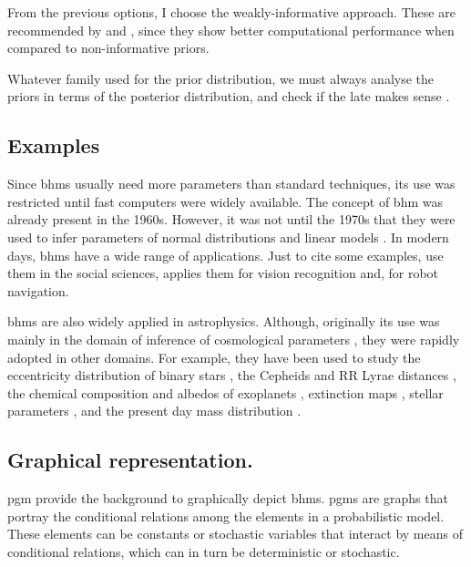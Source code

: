 From the previous options, I choose the weakly-informative approach. These are recommended by \citet{Gelman2006,Gelman2008,Huang2013} and \citet{Chung2015}, since they show better computational performance when compared to non-informative priors.

Whatever family used for the prior distribution, we must always analyse the priors in terms of the posterior distribution, and check if the late makes sense \cite[][ Chap. 6]{Gelman2006,Gelman2013}.


\subsection{Examples}
Since \glspl{bhm}  usually need more parameters than standard techniques, its use was restricted until fast computers were widely available. The concept of \gls{bhm}  was already present in the 1960s. However, it was not until  the 1970s that they were used to infer parameters of normal distributions and linear models \cite[see][for an historical perspective of \glspl{bhm} ]{Good1980}. In modern days, \glspl{bhm}  have a wide range of applications. Just to cite some examples, \citet{Gelman2007} use them in the social sciences, \citet{Fei2005} applies them for vision recognition and, \citet{Diard2008} for robot navigation.

\glspl{bhm} are also widely applied in astrophysics. Although, originally its use was mainly in the domain of inference of cosmological parameters \cite[see for example the works of][]{Feeney2013,March2014,Anderes2015,Shariff2016,Alsing2017}, they were rapidly adopted in other domains. For example, they have been used to study the eccentricity distribution of binary stars \citet{Hogg2010}, the Cepheids \citep{Barnes2004} and RR Lyrae distances \citep{Jefferys2007}, the chemical composition \citep{Wolfgang2015} and albedos of exoplanets \citep{Demory2014}, extinction maps \citep{Sale2012}, stellar parameters \citep{Shkedy2007}, and the present day mass distribution \citep{Tapiador2017}.

\subsection{Graphical representation.}
\label{sect:PGM}
\gls{pgm} provide the background to graphically depict \glspl{bhm}. \glspl{pgm} are graphs that portray the conditional relations among the elements in a probabilistic model. These elements can be constants or stochastic variables that interact by means of conditional relations, which can in turn be deterministic or stochastic. 

